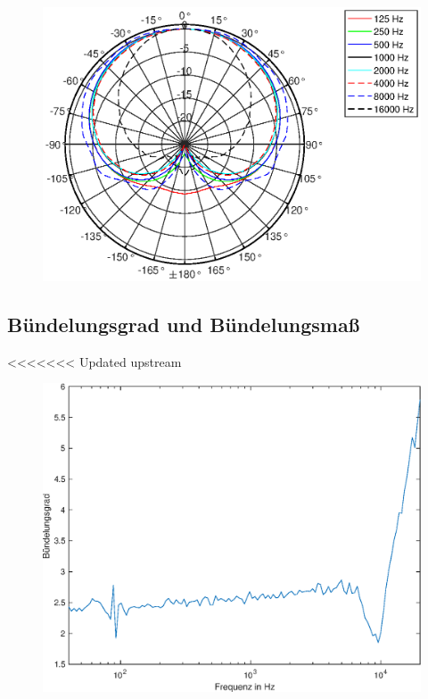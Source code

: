 \begin{figure}[bth]
    \centering
    \includegraphics[width=\linewidth]{Figures/KM184_allfreqs}
    \label{fig:Polar_allfreqs}
\end{figure}


\subsection{Bündelungsgrad und Bündelungsmaß}
\label{subsec:e}
<<<<<<< Updated upstream
\begin{figure}
    \centering
    \includegraphics[width=0.95\linewidth]{Figures/Buendelungsgrad}
    \label{fig:buendel}
\end{figure}

